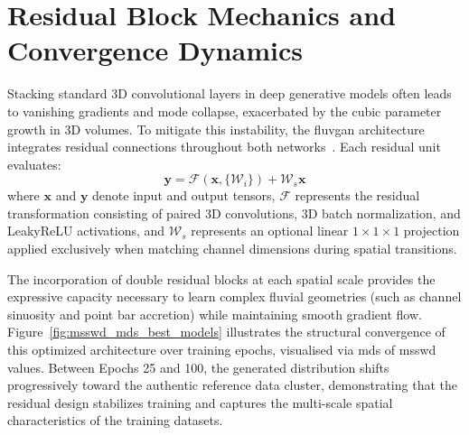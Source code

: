 \section{Residual Block Mechanics and Convergence Dynamics}\label{sec:app_resblocks_design}
Stacking standard 3D convolutional layers in deep generative models often leads to vanishing gradients and mode collapse, exacerbated by the cubic parameter growth in 3D volumes. To mitigate this instability, the \gls{fluvgan} architecture integrates residual connections throughout both networks~\parencite{he2016deep}. Each residual unit evaluates:
\begin{equation}
    \mathbf{y} = \mathcal{F}(\mathbf{x}, \{\mathcal{W}_i\}) + \mathcal{W}_s \mathbf{x}
\end{equation}
where $\mathbf{x}$ and $\mathbf{y}$ denote input and output tensors, $\mathcal{F}$ represents the residual transformation consisting of paired 3D convolutions, 3D batch normalization, and LeakyReLU activations, and $\mathcal{W}_s$ represents an optional linear $1 \times 1 \times 1$ projection applied exclusively when matching channel dimensions during spatial transitions.

The incorporation of double residual blocks at each spatial scale provides the expressive capacity necessary to learn complex fluvial geometries (such as channel sinuosity and point bar accretion) while maintaining smooth gradient flow. Figure~\ref{fig:msswd_mds_best_models} illustrates the structural convergence of this optimized architecture over training epochs, visualised via \gls{mds} of \gls{msswd} values. Between Epochs 25 and 100, the generated distribution shifts progressively toward the authentic reference data cluster, demonstrating that the residual design stabilizes training and captures the multi-scale spatial characteristics of the training datasets.


